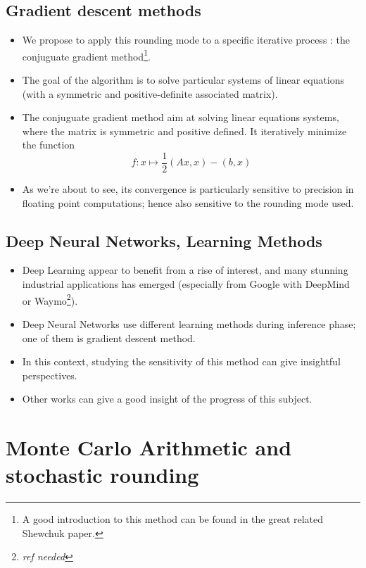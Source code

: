\documentclass[a4paper,11pt]{article}
\let\cite=\supercite
\begin{document}
\subsection{Gradient descent methods}
\begin{itemize}
  \item We propose to apply this rounding mode to a specific iterative process : the conjuguate gradient method\footnote{A good introduction to this method can be found in the great related Shewchuk paper\cite{shewchuk1994introduction}.}. 
  \item The goal of the algorithm is to solve particular systems of linear equations (with a symmetric and positive-definite associated matrix).
  \item The conjuguate gradient method aim at solving linear equations systems, where the matrix is symmetric and positive defined. It iteratively minimize the function 
  \[ f : x \mapsto \frac{1}{2}\left(Ax,x\right)-\left(b,x\right) \] %
  \item As we're about to see, its convergence is particularly sensitive to precision in floating point computations; hence also sensitive to the rounding mode used. %
\end{itemize}
\subsection{Deep Neural Networks, Learning Methods}
\begin{itemize}
   \item Deep Learning appear to benefit from a rise of interest, and many stunning industrial applications has emerged (especially from Google with DeepMind or Waymo\footnote{\emph{ref needed}}).
   \item Deep Neural Networks use different learning methods during inference phase; one of them is gradient descent method.
   \item In this context, studying the sensitivity of this method can give insightful perspectives. %
   \item Other works can give a good insight of the progress of this subject\cite{Gupta2015}\cite{Courbariaux2014}.
 \end{itemize} 


\section{Monte Carlo Arithmetic and stochastic rounding} %
\end{document}
